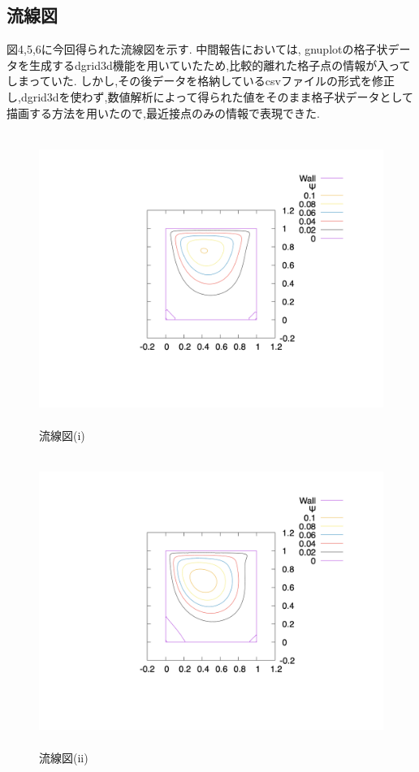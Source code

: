 \documentclass[upLaTeX,a4paper]{jsarticle}
\begin{document}
\subsection{流線図}

図4,5,6に今回得られた流線図を示す.
中間報告においては, gnuplotの格子状データを生成するdgrid3d機能を用いていたため,比較的離れた格子点の情報が入ってしまっていた.
しかし,その後データを格納しているcsvファイルの形式を修正し,dgrid3dを使わず,数値解析によって得られた値をそのまま格子状データとして描画する方法を用いたので,最近接点のみの情報で表現できた.

\begin{figure}[H]
  \centering
  \includegraphics[height=9.5cm]{outputs/img/stream_line_re50.png}
  \caption{流線図(i)}
  \label{fig:velocity_vector_re50}
\end{figure}
\begin{figure}[H]
  \centering
  \includegraphics[height=9.5cm]{outputs/img/stream_line_re200.png}
  \caption{流線図(ii)}
  \label{fig:velocity_vector_re200}
\end{figure}
\end{document}
